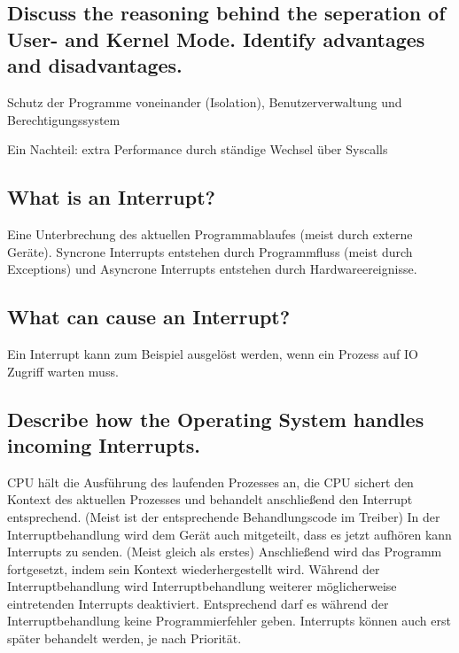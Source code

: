 \subsection{\important Discuss the reasoning behind the seperation of User- and Kernel Mode. Identify advantages and disadvantages.}
Schutz der Programme voneinander (Isolation), Benutzerverwaltung und Berechtigungssystem

Ein Nachteil: extra Performance durch ständige Wechsel über Syscalls

\subsection{\important What is an Interrupt?}
Eine Unterbrechung des aktuellen Programmablaufes (meist durch externe Geräte).
Syncrone Interrupts entstehen durch Programmfluss (meist durch Exceptions) und Asyncrone Interrupts entstehen durch Hardwareereignisse.

\subsection{What can cause an Interrupt?}
Ein Interrupt kann zum Beispiel ausgel\"ost werden, wenn ein Prozess auf IO Zugriff warten muss.

\subsection{Describe how the Operating System handles incoming Interrupts.}
CPU hält die Ausführung des laufenden Prozesses an, die CPU sichert den Kontext des aktuellen Prozesses und  behandelt anschließend den Interrupt entsprechend.
(Meist ist der entsprechende Behandlungscode im Treiber)
In der Interruptbehandlung wird dem Gerät auch mitgeteilt, dass es jetzt aufhören kann Interrupts zu senden.
(Meist gleich als erstes)
Anschließend wird das Programm fortgesetzt, indem sein Kontext wiederhergestellt wird.
Während der Interruptbehandlung wird Interruptbehandlung weiterer möglicherweise eintretenden Interrupts deaktiviert.
Entsprechend darf es während der Interruptbehandlung keine Programmierfehler geben.
Interrupts können auch erst später behandelt werden, je nach Priorität.

